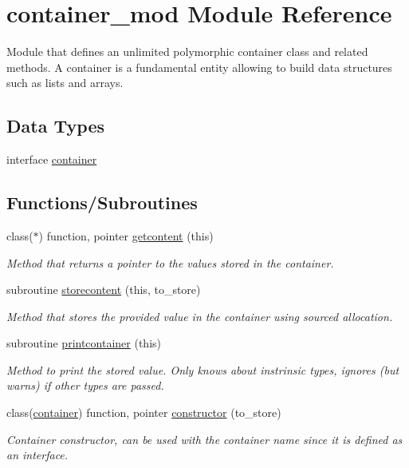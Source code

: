 \hypertarget{namespacecontainer__mod}{}\section{container\+\_\+mod Module Reference}
\label{namespacecontainer__mod}


Module that defines an unlimited polymorphic container class and related methods. A container is a fundamental entity allowing to build data structures such as lists and arrays.  


\subsection*{Data Types}
\begin{DoxyCompactItemize}
\item 
interface \mbox{\hyperlink{structcontainer__mod_1_1container}{container}}
\end{DoxyCompactItemize}
\subsection*{Functions/\+Subroutines}
\begin{DoxyCompactItemize}
\item 
class($\ast$) function, pointer \mbox{\hyperlink{namespacecontainer__mod_a23a016e747d896622127c0c21dca9836}{getcontent}} (this)
\begin{DoxyCompactList}\small\item\em Method that returns a pointer to the values stored in the container. \end{DoxyCompactList}\item 
subroutine \mbox{\hyperlink{namespacecontainer__mod_ace49cee012b6cd3c41c03556ab0dd884}{storecontent}} (this, to\+\_\+store)
\begin{DoxyCompactList}\small\item\em Method that stores the provided value in the container using sourced allocation. \end{DoxyCompactList}\item 
subroutine \mbox{\hyperlink{namespacecontainer__mod_abf1785185971a527e437d3a489462724}{printcontainer}} (this)
\begin{DoxyCompactList}\small\item\em Method to print the stored value. Only knows about instrinsic types, ignores (but warns) if other types are passed. \end{DoxyCompactList}\item 
class(\mbox{\hyperlink{structcontainer__mod_1_1container}{container}}) function, pointer \mbox{\hyperlink{namespacecontainer__mod_a6262df4ff34024d566cf8261dc20a248}{constructor}} (to\+\_\+store)
\begin{DoxyCompactList}\small\item\em Container constructor, can be used with the \textquotesingle{}container\textquotesingle{} name since it is defined as an interface. \end{DoxyCompactList}\end{DoxyCompactItemize}


